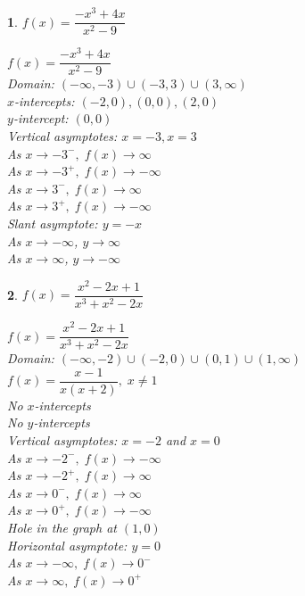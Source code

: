 \documentclass{amsbook}
\newtheorem{exc}{}
\newenvironment{ex}{\begin{exc}\normalfont}{\end{exc}}
\numberwithin{section}{chapter}
\numberwithin{equation}{chapter}
\begin{document}
\begin{multicols}{2}
\begin{ex}
		$f(x) = \dfrac{-x^{3} + 4x}{x^{2} - 9}$
	\begin{sol}
		$f(x) = \dfrac{-x^{3} + 4x}{x^{2} - 9}$\\
		Domain: $(-\infty, -3) \cup (-3, 3) \cup (3, \infty)$\\
		$x$-intercepts: $(-2, 0), (0, 0), (2, 0)$\\
		$y$-intercept: $(0, 0)$\\
		Vertical asymptotes: $x = -3, x = 3$\\
		As $x \rightarrow -3^{-}, \; f(x) \rightarrow \infty$\\
		As $x \rightarrow -3^{+}, \; f(x) \rightarrow -\infty$\\
		As $x \rightarrow 3^{-}, \; f(x) \rightarrow \infty$\\
		As $x \rightarrow 3^{+}, \; f(x) \rightarrow -\infty$\\
		Slant asymptote: $y = -x$\\
				As $x \rightarrow -\infty$, $y\to \infty$\\
		As $x \rightarrow \infty$, $y\to -\infty$
	\end{sol}
\end{ex}

\begin{ex}
	$f(x) = \dfrac{x^{2} - 2x + 1}{x^{3} + x^{2} - 2x}$
	\begin{sol}
		$f(x) = \dfrac{x^{2} - 2x + 1}{x^{3} + x^{2} - 2x}$\\
		Domain: $(-\infty, -2) \cup (-2, 0) \cup (0, 1) \cup (1, \infty)$\\
		$f(x) = \dfrac{x - 1}{x(x + 2)}, \; x \neq 1$\\
		No $x$-intercepts\\
		No $y$-intercepts\\
		Vertical asymptotes: $x = -2$ and $x = 0$\\
		As $x \rightarrow -2^{-}, \; f(x) \rightarrow -\infty$\\
		As $x \rightarrow -2^{+}, \; f(x) \rightarrow \infty$\\
		As $x \rightarrow 0^{-}, \; f(x) \rightarrow \infty$\\
		As $x \rightarrow 0^{+}, \; f(x) \rightarrow -\infty$\\
		Hole in the graph at $(1, 0)$\\
		Horizontal asymptote: $y = 0$\\
		As $x \rightarrow -\infty, \; f(x) \rightarrow 0^{-}$\\
		As $x \rightarrow \infty, \; f(x) \rightarrow 0^{+}$
	\end{sol}
\end{ex}

\end{multicols}
\end{document}
